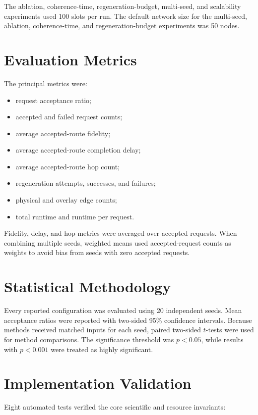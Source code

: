 The ablation, coherence-time, regeneration-budget, multi-seed, and scalability
experiments used 100 slots per run. The default network size for the multi-seed,
ablation, coherence-time, and regeneration-budget experiments was 50 nodes.

\section{Evaluation Metrics}

The principal metrics were:

\begin{itemize}
    \item request acceptance ratio;
    \item accepted and failed request counts;
    \item average accepted-route fidelity;
    \item average accepted-route completion delay;
    \item average accepted-route hop count;
    \item regeneration attempts, successes, and failures;
    \item physical and overlay edge counts;
    \item total runtime and runtime per request.
\end{itemize}

Fidelity, delay, and hop metrics were averaged over accepted requests. When
combining multiple seeds, weighted means used accepted-request counts as weights
to avoid bias from seeds with zero accepted requests.

\section{Statistical Methodology}

Every reported configuration was evaluated using 20 independent seeds. Mean
acceptance ratios were reported with two-sided 95\% confidence intervals.
Because methods received matched inputs for each seed, paired two-sided
\(t\)-tests were used for method comparisons. The significance threshold was
\(p<0.05\), while results with \(p<0.001\) were treated as highly significant.

\section{Implementation Validation}

Eight automated tests verified the core scientific and resource invariants:

